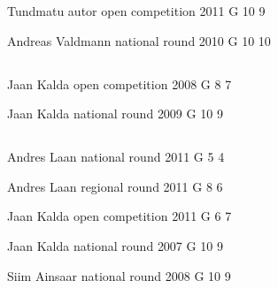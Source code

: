 \documentclass[11pt]{article}
\begin{document}
\ylDisplay{} %
{Tundmatu autor} %
{open competition} %
{2011} %
{G 10} %
{9} %
{

\ifEngStatement
\fi
}

\ylDisplay{} %
{Andreas Valdmann} %
{national round} %
{2010} %
{G 10} %
{10} %
{

\ifEngStatement
\fi
}
\newpage\subsection{\protect{}}

\ylDisplay{} %
{Jaan Kalda} %
{open competition} %
{2008} %
{G 8} %
{7} %
{

\ifEngStatement
\fi
}

\ylDisplay{} %
{Jaan Kalda} %
{national round} %
{2009} %
{G 10} %
{9} %
{

\ifEngStatement
\fi
}
\newpage\subsection{\protect{}}

\ylDisplay{} %
{Andres Laan} %
{national round} %
{2011} %
{G 5} %
{4} %
{

\ifEngStatement
\fi
}

\ylDisplay{} %
{Andres Laan} %
{regional round} %
{2011} %
{G 8} %
{6} %
{

\ifEngStatement
\fi
}

\ylDisplay{} %
{Jaan Kalda} %
{open competition} %
{2011} %
{G 6} %
{7} %
{

\ifEngStatement
\fi
}

\ylDisplay{} %
{Jaan Kalda} %
{national round} %
{2007} %
{G 10} %
{9} %
{

\ifEngStatement
\fi
}

\ylDisplay{} %
{Siim Ainsaar} %
{national round} %
{2008} %
{G 10} %
{9} %
{

\ifEngStatement
\fi
}
\end{document}
